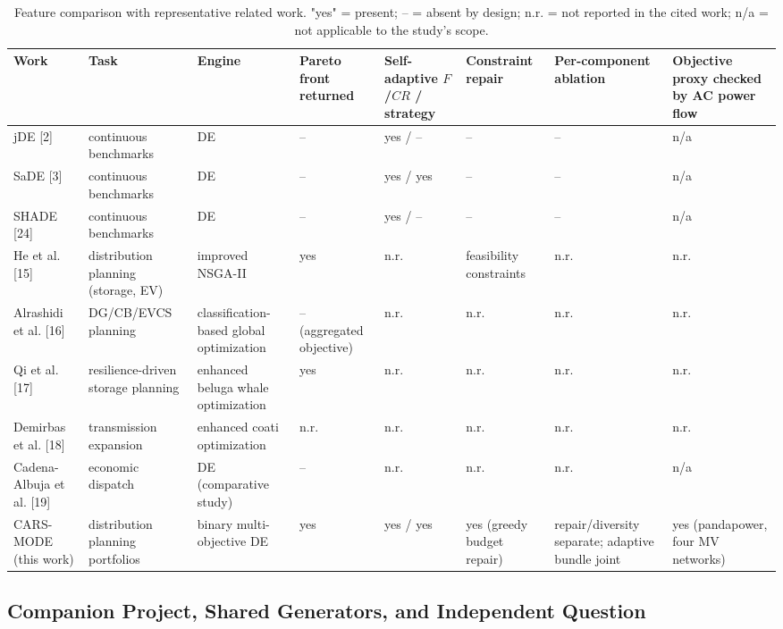\documentclass[energies,article,submit,moreauthors]{Definitions/mdpi}
\begin{document}
\begin{table}[t]
\centering
\scriptsize
\setlength{\tabcolsep}{3pt}
\caption{Feature comparison with representative related work. "yes" = present; -- = absent by design; n.r. = not reported in the cited work; n/a = not applicable to the study's scope.}\label{tab:1}
\begin{tabularx}{\textwidth}{@{}>{\raggedright\arraybackslash}X >{\raggedright\arraybackslash}X >{\raggedright\arraybackslash}X >{\raggedright\arraybackslash}X >{\raggedright\arraybackslash}X >{\raggedright\arraybackslash}X >{\raggedright\arraybackslash}X >{\raggedright\arraybackslash}X@{}}
\toprule
Work & Task & Engine & Pareto front returned & Self-adaptive $F$/$CR$ / strategy & Constraint repair & Per-component ablation & Objective proxy checked by AC power flow \\
\midrule
jDE [2] & continuous benchmarks & DE & -- & yes / -- & -- & -- & n/a \\
SaDE [3] & continuous benchmarks & DE & -- & yes / yes & -- & -- & n/a \\
SHADE [24] & continuous benchmarks & DE & -- & yes / -- & -- & -- & n/a \\
He et al. [15] & distribution planning (storage, EV) & improved NSGA-II & yes & n.r. & feasibility constraints & n.r. & n.r. \\
Alrashidi et al. [16] & DG/CB/EVCS planning & classification-based global optimization & -- (aggregated objective) & n.r. & n.r. & n.r. & n.r. \\
Qi et al. [17] & resilience-driven storage planning & enhanced beluga whale optimization & yes & n.r. & n.r. & n.r. & n.r. \\
Demirbas et al. [18] & transmission expansion & enhanced coati optimization & n.r. & n.r. & n.r. & n.r. & n.r. \\
Cadena-Albuja et al. [19] & economic dispatch & DE (comparative study) & -- & n.r. & n.r. & n.r. & n/a \\
CARS-MODE (this work) & distribution planning portfolios & binary multi-objective DE & yes & yes / yes & yes (greedy budget repair) & repair/diversity separate; adaptive bundle joint & yes (pandapower, four MV networks) \\
\bottomrule
\end{tabularx}
\end{table}

\subsection{Companion Project, Shared Generators, and Independent Question}\label{companion-project-shared-generators-and-independent-question}
\end{document}
